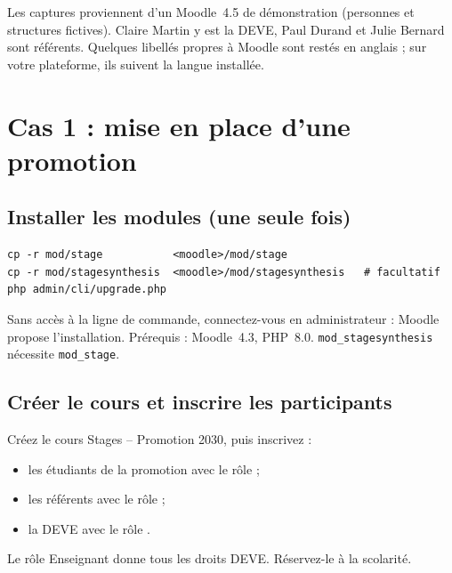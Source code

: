 \documentclass[11pt,a4paper]{article}
\begin{document}
Les captures proviennent d'un Moodle~4.5 de démonstration (personnes et
structures fictives). Claire Martin y est la DEVE, Paul Durand et Julie Bernard
sont référents. Quelques libellés propres à Moodle sont restés en anglais ; sur
votre plateforme, ils suivent la langue installée.

\section{Cas 1 : mise en place d'une promotion}
\label{sec:cas1}

\subsection{Installer les modules (une seule fois)}
\label{sec:installation}

\begin{verbatim}
cp -r mod/stage           <moodle>/mod/stage
cp -r mod/stagesynthesis  <moodle>/mod/stagesynthesis   # facultatif
php admin/cli/upgrade.php
\end{verbatim}

Sans accès à la ligne de commande, connectez-vous en administrateur : Moodle
propose l'installation. Prérequis : Moodle~4.3, PHP~8.0.
\texttt{mod\_stagesynthesis} nécessite \texttt{mod\_stage}.


\subsection{Créer le cours et inscrire les participants}

Créez le cours \og Stages -- Promotion 2030\fg{}, puis inscrivez :
\begin{itemize}
  \item les étudiants de la promotion avec le rôle  ;
  \item les référents avec le rôle  ;
  \item la DEVE avec le rôle .
\end{itemize}


\begin{attention}
Le rôle \og Enseignant\fg{} donne tous les droits DEVE. Réservez-le à la
scolarité.
\end{attention}
\end{document}
